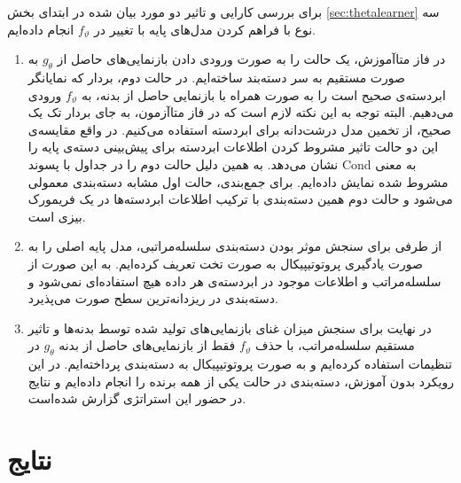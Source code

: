 برای بررسی کارایی و تاثیر دو مورد بیان شده در ابتدای بخش
\ref{sec:thetalearner}
سه نوع 
با فراهم کردن مدل‌های پایه با تغییر در 
$f_\vartheta$
انجام داده‌ایم. 
\begin{enumerate}
	\item 
در فاز متا‌آموزش، یک حالت را به صورت ورودی دادن بازنمایی‌های حاصل از 
$g_\theta$
به صورت مستقیم به سر دسته‌بند ساخته‌ایم. در حالت دوم، بردار
 که نمایانگر ابردسته‌ی صحیح است را به صورت 
همراه با بازنمایی حاصل از بدنه، به 
$f_\vartheta$
ورودی می‌دهیم. البته توجه به این نکته لازم است که در فاز متاآزمون، به جای بردار تک یک صحیح، از تخمین مدل درشت‌دانه برای ابردسته استفاده می‌کنیم. در واقع مقایسه‌ی این دو حالت تاثیر مشروط کردن اطلاعات ابردسته برای پیش‌بینی دسته‌ی پایه را نشان می‌دهد. به همین دلیل حالت دوم را در جداول با پسوند Cond به معنی مشروط شده نمایش داده‌ایم. برای جمع‌بندی، حالت اول مشابه دسته‌بندی 
معمولی می‌شود و حالت دوم همین دسته‌بندی با ترکیب اطلاعات ابردسته‌ها در یک فریمورک بیزی است.

\item
از طرفی برای سنجش موثر بودن دسته‌بندی سلسله‌مراتبی، مدل پایه اصلی را به صورت یادگیری پروتوتیپیکال به صورت تخت تعریف کرده‌ایم. به این صورت از سلسله‌مراتب و اطلاعات موجود در ابردسته‌ی هر داده هیچ استفاده‌ای نمی‌شود و دسته‌بندی در ریزدانه‌ترین سطح صورت می‌پذیرد.

\item 
در نهایت برای سنجش میزان غنای بازنمایی‌های تولید شده توسط بدنه‌ها و تاثیر مستقیم سلسله‌مراتب، با حذف 
$f_\vartheta$
فقط از بازنمایی‌های حاصل از بدنه 
$g_\theta$
در تنظیمات 
استفاده کرده‌ایم و به صورت پروتوتیپیکال به دسته‌بندی پرداخته‌ایم. در این رویکرد بدون آموزش، دسته‌بندی در حالت یکی از همه برنده را انجام داده‌ایم و نتایج در حضور این استراتژی گزارش شده‌است. 

\end{enumerate}

\section{نتایج}


